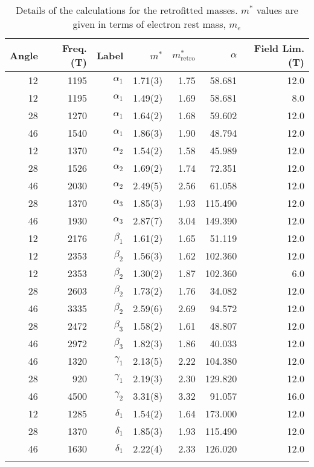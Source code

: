 \begin{sidewaystable}
    \begin{center}
        \caption{Details of the calculations for the retrofitted masses. $m^*$ values are given in terms of electron rest mass, $m_e$}
{\small
        \begin{tabular}[htbp]{rrrrrrr}
\toprule
Angle	& Freq. (\unit[]{T})	& Label & $m^*$ & $m^*_{\textrm{retro}}$	& $\alpha$	& Field Lim. (\unit[]{T}) \\
\midrule
12	 & 1195	 & $\alpha_1$	 & 1.71(3)	& 1.75	& 58.681	& 12.0\\
12	 & 1195	 & $\alpha_1$	 & 1.49(2)	& 1.69	& 58.681	& 8.0\\
28	 & 1270	 & $\alpha_1$	 & 1.64(2)	& 1.68	& 59.602	& 12.0\\
46	 & 1540	 & $\alpha_1$	 & 1.86(3)	& 1.90	& 48.794	& 12.0\\
12	 & 1370	 & $\alpha_2$	 & 1.54(2)	& 1.58	& 45.989	& 12.0\\
28	 & 1526	 & $\alpha_2$	 & 1.69(2)	& 1.74	& 72.351	& 12.0\\
46	 & 2030	 & $\alpha_2$	 & 2.49(5)	& 2.56	& 61.058	& 12.0\\
28	 & 1370	 & $\alpha_3$	 & 1.85(3)	& 1.93	& 115.490	& 12.0\\
46	 & 1930	 & $\alpha_3$	 & 2.87(7)	& 3.04	& 149.390	& 12.0\\
12	 & 2176	 & $\beta_1$	 & 1.61(2)	& 1.65	& 51.119	& 12.0\\
12	 & 2353	 & $\beta_2$	 & 1.56(3)	& 1.62	& 102.360	& 12.0\\
12	 & 2353	 & $\beta_2$	 & 1.30(2)	& 1.87	& 102.360	& 6.0\\
28	 & 2603	 & $\beta_2$	 & 1.73(2)	& 1.76	& 34.082	& 12.0\\
46	 & 3335	 & $\beta_2$	 & 2.59(6)	& 2.69	& 94.572	& 12.0\\
28	 & 2472	 & $\beta_3$	 & 1.58(2)	& 1.61	& 48.807	& 12.0\\
46	 & 2972	 & $\beta_3$	 & 1.82(3)	& 1.86	& 40.033	& 12.0\\
46	 & 1320	 & $\gamma_1$	 & 2.13(5)	& 2.22	& 104.380	& 12.0\\
28	 & 920	 & $\gamma_1$	 & 2.19(3)	& 2.30	& 129.820	& 12.0\\
46	 & 4500	 & $\gamma_2$	 & 3.31(8)	& 3.32	& 91.057	& 16.0\\
12	 & 1285	 & $\delta_1$	 & 1.54(2)	& 1.64	& 173.000	& 12.0\\
28	 & 1370	 & $\delta_1$	 & 1.85(3)	& 1.93	& 115.490	& 12.0\\
46	 & 1630	 & $\delta_1$	 & 2.22(4)	& 2.33	& 126.020	& 12.0\\
\bottomrule
        \label{Table:3:RetroFittedLKResults}
        \end{tabular}
}
    \end{center}
\end{sidewaystable}

